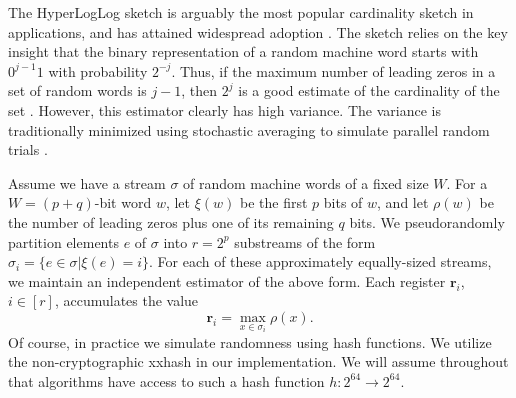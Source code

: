 \documentclass{vldb}
\begin{document}
The HyperLogLog sketch is arguably the most popular cardinality sketch in applications, and has attained widespread adoption \cite{flajolet2007hyperloglog}.
The sketch relies on the key insight that the binary representation of a random machine word  starts with $0^{j-1} 1$ with probability $2^{-j}$. 
Thus, if the maximum number of leading zeros in a set of random words is $j-1$, then $2^j$ is a good estimate of the cardinality of the set \cite{flajolet1985probabilistic}.
However, this estimator clearly has high variance. 
The variance is traditionally minimized using stochastic averaging to simulate parallel random trials \cite{flajolet1985probabilistic}.

Assume we have a stream $\sigma$ of random machine words of a fixed size $W$.
For a $W=(p + q)$-bit word $w$, let $\xi(w)$ be the first $p$ bits of $w$, and let $\rho(w)$ be the number of leading zeros plus one of its remaining $q$ bits.
We pseudorandomly partition elements $e$ of $\sigma$ into $r = 2^p$ substreams of the form $\sigma_i = \{ e \in \sigma | \xi(e) = i \}$.
For each of these approximately equally-sized streams, we maintain an independent estimator of the above form.
Each register $\mathbf{r}_i$, $i \in [r]$, accumulates the value
%
\begin{equation} \label{eq:register}
\mathbf{r}_i = \max\limits_{x \in \sigma_i} \rho(x).
\end{equation}
%
Of course, in practice we simulate randomness using hash functions.
We utilize the non-cryptographic xxhash \cite{xxhash}  in our implementation. 
We will assume throughout that algorithms have access to such a hash function $h : 2^{64} \rightarrow 2^{64}$.
\end{document}
